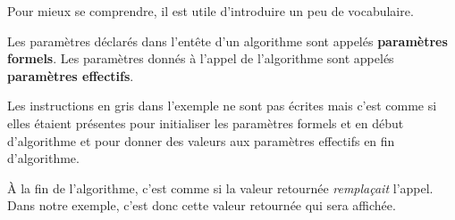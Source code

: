 	Pour mieux se comprendre, il est utile d’introduire un peu de vocabulaire.
	
	Les paramètres déclarés dans l’entête d’un algorithme sont appelés
	\textbf{paramètres formels}.  Les paramètres donnés à l’appel de
	l’algorithme sont appelés \textbf{paramètres effectifs}. 
	
	Les instructions en gris dans l’exemple ne sont pas écrites mais c’est comme
	si elles étaient présentes pour initialiser les paramètres formels \In{} et
	\InOut{} en début d’algorithme et pour donner des valeurs aux paramètres
	effectifs \InOut{} en fin d’algorithme.
	
	À la fin de l’algorithme, c’est comme si la valeur retournée
	\emph{remplaçait} l’appel.  Dans notre exemple, c’est donc cette valeur
	retournée qui sera affichée.
	

